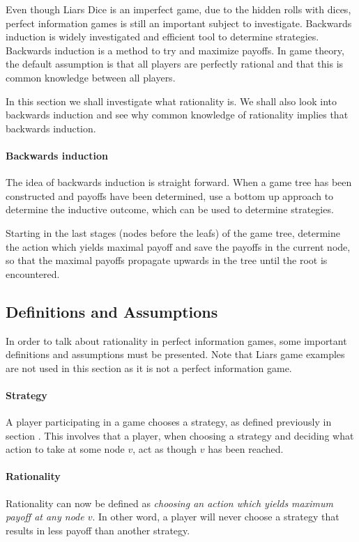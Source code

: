 Even though Liars Dice is an imperfect game, due to the hidden rolls with dices, perfect information games is still an important subject to investigate. 
Backwards induction is widely investigated and efficient tool to determine strategies. Backwards induction is a method to try and maximize payoffs.
In game theory, the default assumption is that all players are perfectly rational and that this is common knowledge between all players.

In this section we shall investigate what rationality is. We shall also look into backwards induction and see why common knowledge of rationality implies that backwards induction.

\paragraph*{Backwards induction}
The idea of backwards induction is straight forward. When a game tree has been constructed and payoffs have been determined, use a bottom up approach to determine the inductive outcome, which can be used to determine strategies. 

Starting in the last stages (nodes before the leafs) of the game tree, determine the action which yields maximal payoff and save the payoffs in the current node, so that the maximal payoffs propagate upwards in the tree until the root is encountered.

\subsection{Definitions and Assumptions}
In order to talk about rationality in perfect information games, some important definitions and assumptions must be presented. Note that Liars game examples are not used in this section as it is not a perfect information game.

\paragraph*{Strategy} A player participating in a game chooses a strategy, as defined previously in section . This involves that a player, when choosing a strategy and deciding what action to take at some node $v$, act as though $v$ has been reached.

\paragraph*{Rationality} Rationality can now be defined as \textit{choosing an action which yields maximum payoff at any node $v$}. In other word, a player will never choose a strategy that results in less payoff than another strategy.

